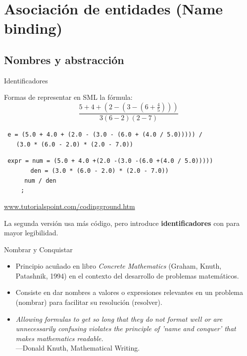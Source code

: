 \documentclass{beamer} %
\newcommand{\redb}[1]{{\color{red!70!black}{#1}}}
\begin{document}

\section{Asociación de entidades (Name binding)}

\subsection{Nombres y abstracción}

\begin{frame}{Identificadores}
    
    Formas de representar en SML la fórmula:
    $$\frac{5+4+(2-(3-(6+\frac{4}{5})))}{3(6-2)(2-7)}$$
    \medskip
    
    {\footnotesize 
    \texttt{\redb{val} e = (5.0 + 4.0 + (2.0 - (3.0 - (6.0 + (4.0 / 5.0))))) /}\\
    \texttt{$~~~~~~~~$(3.0 * (6.0 - 2.0) * (2.0 - 7.0))}}
    \bigskip
    
    {\scriptsize 
    \texttt{\redb{val} expr = \redb{let val} num = (5.0 + 4.0 +(2.0 -(3.0 -(6.0 +(4.0 / 5.0)))))}\\
    \texttt{$~~~~~~~~~~~~~~~$\redb{val} den = (3.0 * (6.0 - 2.0) * (2.0 - 7.0))}\\
    \texttt{$~~~~~~~~~~~$\redb{in} num / den}\\
    \texttt{$~~~~~~~~~~~$\redb{end};}
    }\medskip
    
    \url{www.tutorialspoint.com/codingground.htm}
    \pause\smallskip
    
    La segunda versión usa más código, pero introduce \textbf{identificadores} con \redb{\texttt{let}} para mayor legibilidad.
\end{frame}

\begin{frame}{Nombrar y Conquistar}
    \begin{itemize}
        \item<1-> Principio acuñado en libro {\em Concrete Mathematics} (Graham, Knuth, Patashnik, 1994) en el contexto del desarrollo de problemas matemáticos.
        \item<1-> Consiste en dar nombres a valores o expresiones relevantes en un problema (nombrar) para facilitar su resolución (resolver).
        \item<2-> {\em Allowing formulas to get so long that they do not format well or are unnecessarily confusing violates the principle of 'name and conquer' that makes mathematics readable.}\\ ---Donald Knuth, Mathematical Writing.
    \end{itemize}
\end{frame}
\end{document}
